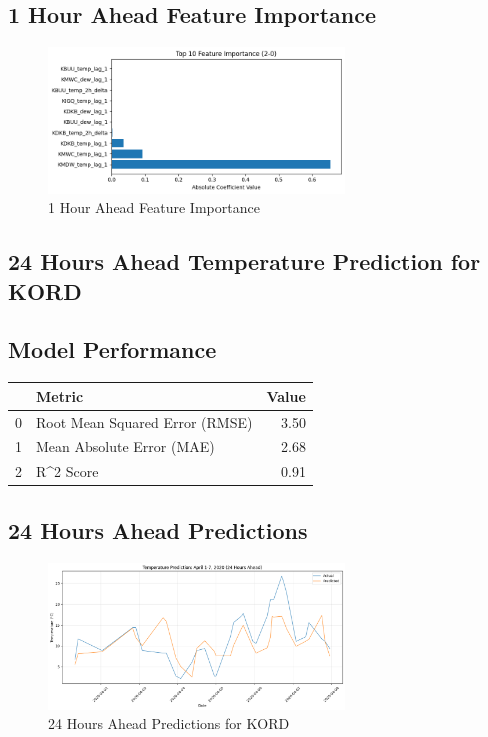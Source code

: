 \subsection{1 Hour Ahead Feature Importance}
\begin{figure}[htbp]
\centering
\includegraphics[width=0.7\textwidth]{2-0-gradient_boost_temp_shift_feature_importance.png}
\caption{1 Hour Ahead Feature Importance}
\label{fig:1_hour_ahead_featimp}
\end{figure}



\subsection{24 Hours Ahead Temperature Prediction for KORD}
\subsection{Model Performance}
\begin{tabular}{llr}
\toprule
 & Metric & Value \\
\midrule
0 & Root Mean Squared Error (RMSE) & 3.50 \\
1 & Mean Absolute Error (MAE) & 2.68 \\
2 & R^2 Score & 0.91 \\
\bottomrule
\end{tabular}

\subsection{24 Hours Ahead Predictions}
\begin{figure}[htbp]
\centering
\includegraphics[width=0.7\textwidth]{2-1-gradient_boost_temp_shift_results.png}
\caption{24 Hours Ahead Predictions for KORD}
\label{fig:24_hours_ahead_pred}
\end{figure}

